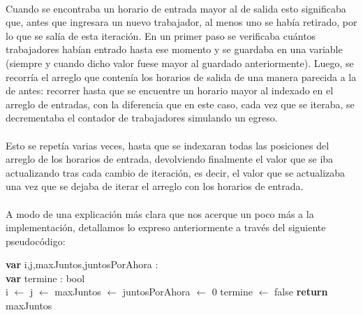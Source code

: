 \paragraph{}
Cuando se encontraba un horario de entrada mayor al de salida esto significaba que, antes que ingresara un nuevo trabajador, al menos uno se hab\'ia retirado, por lo que se sal\'ia de esta iteraci\'on. En un primer paso se verificaba cu\'antos trabajadores habían entrado hasta ese momento y se guardaba en una variable (siempre y cuando dicho valor fuese mayor al guardado anteriormente). Luego, se recorr\'ia el arreglo que conten\'ia los horarios de salida de una manera parecida a la de antes: recorrer hasta que se encuentre un horario mayor al indexado en el arreglo de entradas, con la diferencia que en este caso, cada vez que se iteraba, se decrementaba el contador de trabajadores simulando un egreso.

\paragraph{}
Esto se repet\'ia varias veces, hasta que se indexaran todas las posiciones del arreglo de los horarios de entrada, devolviendo finalmente el valor que se iba actualizando tras cada cambio de iteraci\'on, es decir, el valor que se actualizaba una vez que se dejaba de iterar el arreglo con los horarios de entrada.

\paragraph{}
A modo de una explicaci\'on m\'as clara que nos acerque un poco m\'as a la implementaci\'on, detallamos lo expreso anteriormente a trav\'es del siguiente pseudoc\'odigo:

\incmargin{1em}
\linesnumbered
{}


\begin{algorithm}[H]
\BlankLine
\textbf{var} i,j,maxJuntos,juntosPorAhora : \entero \\
\textbf{var} termine : bool \\
\BlankLine
i $\leftarrow$ j $\leftarrow$ maxJuntos $\leftarrow$ juntosPorAhora $\leftarrow$ 0
termine $\leftarrow$ false
\BlankLine
{}
\BlankLine
\textbf{return} maxJuntos
\end{algorithm}

